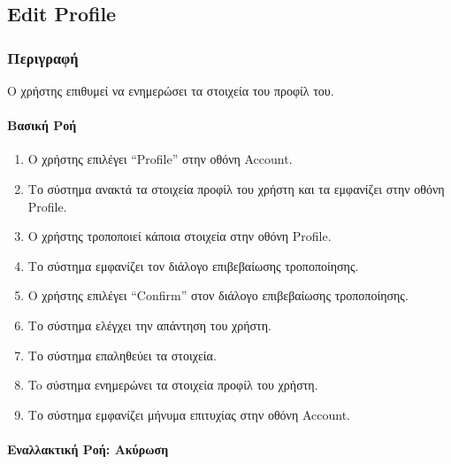 \hypertarget{edit-profile}{%
\subsection{Edit Profile}\label{edit-profile}}

\hypertarget{ux3c0ux3b5ux3c1ux3b9ux3b3ux3c1ux3b1ux3c6ux3ae}{%
\subsubsection{Περιγραφή}\label{ux3c0ux3b5ux3c1ux3b9ux3b3ux3c1ux3b1ux3c6ux3ae}}

Ο χρήστης επιθυμεί να ενημερώσει τα στοιχεία του προφίλ του.

\hypertarget{ux3b2ux3b1ux3c3ux3b9ux3baux3ae-ux3c1ux3bfux3ae}{%
\paragraph{Βασική
Ροή}\label{ux3b2ux3b1ux3c3ux3b9ux3baux3ae-ux3c1ux3bfux3ae}}

\begin{enumerate}
\def\labelenumi{\arabic{enumi}.}
\tightlist
\item
  Ο χρήστης επιλέγει ``Profile'' στην οθόνη Account.
\item
  Το σύστημα ανακτά τα στοιχεία προφίλ του χρήστη και τα εμφανίζει στην
  οθόνη Profile.
\item
  Ο χρήστης τροποποιεί κάποια στοιχεία στην οθόνη Profile.
\item
  Το σύστημα εμφανίζει τον διάλογο επιβεβαίωσης τροποποίησης.
\item
  Ο χρήστης επιλέγει ``Confirm'' στον διάλογο επιβεβαίωσης τροποποίησης.
\item
  Το σύστημα ελέγχει την απάντηση του χρήστη.
\item
  Το σύστημα επαληθεύει τα στοιχεία.
\item
  To σύστημα ενημερώνει τα στοιχεία προφίλ του χρήστη.
\item
  Το σύστημα εμφανίζει μήνυμα επιτυχίας στην οθόνη Account.
\end{enumerate}

\hypertarget{ux3b5ux3bdux3b1ux3bbux3bbux3b1ux3baux3c4ux3b9ux3baux3ae-ux3c1ux3bfux3ae-ux3b1ux3baux3cdux3c1ux3c9ux3c3ux3b7}{%
\paragraph{Εναλλακτική Ροή:
Ακύρωση}\label{ux3b5ux3bdux3b1ux3bbux3bbux3b1ux3baux3c4ux3b9ux3baux3ae-ux3c1ux3bfux3ae-ux3b1ux3baux3cdux3c1ux3c9ux3c3ux3b7}}

